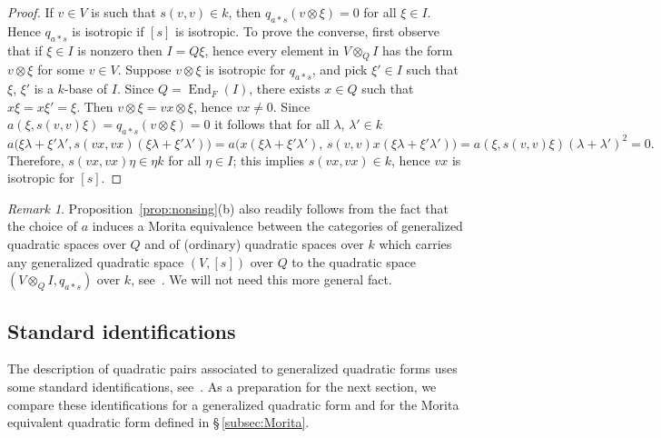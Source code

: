 \documentclass{amsart}
\DeclareMathOperator{\End}{End}
\theoremstyle{remark}
\newtheorem*{remk}{Remark}
\begin{document}
\begin{proof}
  If $v\in V$ is such that $s(v,v)\in k$, then
  $q_{a*s}(v\otimes\xi)=0$ for all $\xi\in I$. Hence $q_{a*s}$ is
  isotropic if $[s]$ is isotropic. To prove the converse, first observe that if
  $\xi\in I$ is nonzero then $I=Q\xi$, hence every element in
  $V\otimes_QI$ has the form $v\otimes\xi$ for some $v\in V$. Suppose
  $v\otimes\xi$ is isotropic for $q_{a*s}$, and pick $\xi'\in I$ such
  that $\xi$, $\xi'$ is a $k$-base of $I$. Since $Q=\End_F(I)$, there
  exists $x\in Q$ such that $x\xi=x\xi'=\xi$. Then
  $v\otimes\xi=vx\otimes\xi$, hence $vx\neq0$. Since
  $a(\xi,s(v,v)\xi)=q_{a*s}(v\otimes\xi)=0$ it follows that for all
  $\lambda$, $\lambda'\in k$
  \[
    a\bigl(\xi\lambda+\xi'\lambda',
    s(vx,vx)(\xi\lambda+\xi'\lambda')\bigr) =
    a\bigl(x(\xi\lambda+\xi'\lambda'),\,
    s(v,v)x(\xi\lambda+\xi'\lambda')\bigr)  =
    a(\xi,s(v,v)\xi)(\lambda+\lambda')^2=0.
  \]
  Therefore, $s(vx,vx)\eta\in\eta k$ for all $\eta\in I$; this implies
  $s(vx,vx)\in k$, hence $vx$ is isotropic for $[s]$.
\end{proof}

\begin{remk}
Proposition~\ref{prop:nonsing}(b) also readily follows from the fact that
the choice of $a$ induces a Morita equivalence between the categories of generalized quadratic
spaces over $Q$ and of (ordinary) quadratic spaces over $k$ which carries
any generalized quadratic space $(V,[s])$ over $Q$ to the quadratic
space $(V\otimes_QI, q_{a*s})$ over $k$, see~\cite[I.9]{Knus}. We will
not need this more general fact.
\end{remk}

\subsection{Standard identifications}
\label{subsec:standard}
The description of quadratic pairs associated to generalized quadratic
forms uses some standard identifications, see~\cite[\S\,5.A]{BoI}. As
a preparation for the next section, we compare these identifications
for a generalized quadratic form and for the Morita equivalent
quadratic form defined in \S\,\ref{subsec:Morita}.  
\end{document}

